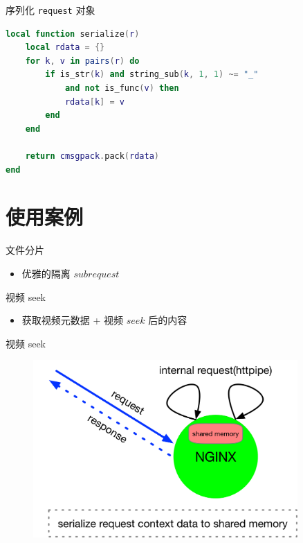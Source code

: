 \documentclass[aspectratio=32]{beamer}
\begin{document}
\begin{frame}[fragile]{序列化 \lstinline|request| 对象}
\small
\begin{lstlisting}[language=lua]
local function serialize(r)
    local rdata = {}
    for k, v in pairs(r) do
        if is_str(k) and string_sub(k, 1, 1) ~= "_"
            and not is_func(v) then
            rdata[k] = v
        end
    end

    return cmsgpack.pack(rdata)
end
\end{lstlisting}
\end{frame}

\section{使用案例}

\begin{frame}[fragile]{文件分片}
\begin{itemize}
  \item 优雅的隔离 $subrequest$
\end{itemize}
\end{frame}

\begin{frame}[fragile]{视频 seek}
\begin{itemize}
  \item 获取视频元数据 + 视频 $seek$ 后的内容
\end{itemize}
\end{frame}

\begin{frame}[fragile]{视频 seek}
\begin{center}
  \begin{figure}[htlp]
    \includegraphics[width=0.9\textwidth]{seek.png}
  \end{figure}
\end{center}
\end{frame}
\end{document}
